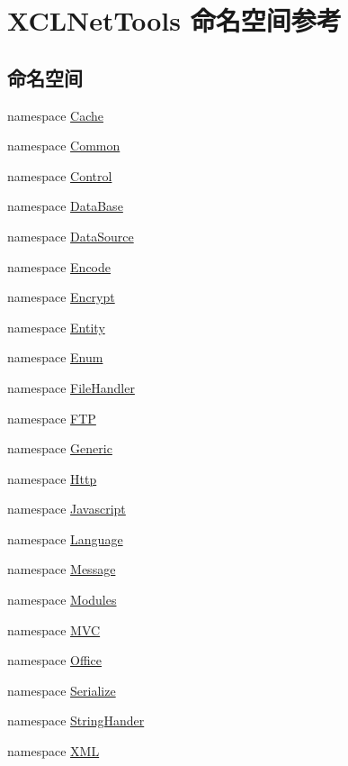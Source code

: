 \hypertarget{namespace_x_c_l_net_tools}{}\section{X\+C\+L\+Net\+Tools 命名空间参考}
\label{namespace_x_c_l_net_tools}
\subsection*{命名空间}
\begin{DoxyCompactItemize}
\item 
namespace \hyperlink{namespace_x_c_l_net_tools_1_1_cache}{Cache}
\item 
namespace \hyperlink{namespace_x_c_l_net_tools_1_1_common}{Common}
\item 
namespace \hyperlink{namespace_x_c_l_net_tools_1_1_control}{Control}
\item 
namespace \hyperlink{namespace_x_c_l_net_tools_1_1_data_base}{Data\+Base}
\item 
namespace \hyperlink{namespace_x_c_l_net_tools_1_1_data_source}{Data\+Source}
\item 
namespace \hyperlink{namespace_x_c_l_net_tools_1_1_encode}{Encode}
\item 
namespace \hyperlink{namespace_x_c_l_net_tools_1_1_encrypt}{Encrypt}
\item 
namespace \hyperlink{namespace_x_c_l_net_tools_1_1_entity}{Entity}
\item 
namespace \hyperlink{namespace_x_c_l_net_tools_1_1_enum}{Enum}
\item 
namespace \hyperlink{namespace_x_c_l_net_tools_1_1_file_handler}{File\+Handler}
\item 
namespace \hyperlink{namespace_x_c_l_net_tools_1_1_f_t_p}{F\+TP}
\item 
namespace \hyperlink{namespace_x_c_l_net_tools_1_1_generic}{Generic}
\item 
namespace \hyperlink{namespace_x_c_l_net_tools_1_1_http}{Http}
\item 
namespace \hyperlink{namespace_x_c_l_net_tools_1_1_javascript}{Javascript}
\item 
namespace \hyperlink{namespace_x_c_l_net_tools_1_1_language}{Language}
\item 
namespace \hyperlink{namespace_x_c_l_net_tools_1_1_message}{Message}
\item 
namespace \hyperlink{namespace_x_c_l_net_tools_1_1_modules}{Modules}
\item 
namespace \hyperlink{namespace_x_c_l_net_tools_1_1_m_v_c}{M\+VC}
\item 
namespace \hyperlink{namespace_x_c_l_net_tools_1_1_office}{Office}
\item 
namespace \hyperlink{namespace_x_c_l_net_tools_1_1_serialize}{Serialize}
\item 
namespace \hyperlink{namespace_x_c_l_net_tools_1_1_string_hander}{String\+Hander}
\item 
namespace \hyperlink{namespace_x_c_l_net_tools_1_1_x_m_l}{X\+ML}
\end{DoxyCompactItemize}
